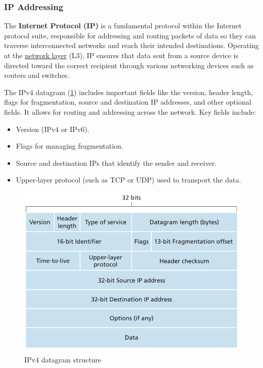 \subsubsection{IP Addressing} \label{ip_addr}

The \textbf{Internet Protocol (IP)} is a fundamental protocol within the Internet protocol suite, responsible for addressing and routing packets of data so they can traverse interconnected networks and reach their intended destinations. Operating at the \hyperref[layer3]{network layer} (L3), IP ensures that data sent from a source device is directed toward the correct recipient through various networking devices such as routers and switches.

The IPv4 datagram (\cref{fig:datagram}) includes important fields like the version, header length, flags for fragmentation, source and destination IP addresses, and other optional fields. It allows for routing and addressing across the network. Key fields include:

\begin{itemize}
    \item Version (IPv4 or IPv6).
    \item Flags for managing fragmentation.
    \item Source and destination IPs that identify the sender and receiver.
    \item Upper-layer protocol (such as TCP or UDP) used to transport the data.
\end{itemize}

\begin{figure}[H]
    \centering
    \includegraphics[scale = 0.4]{assets/datagram.png}
    \caption{IPv4 datagram structure} \label{fig:datagram}
\end{figure}

